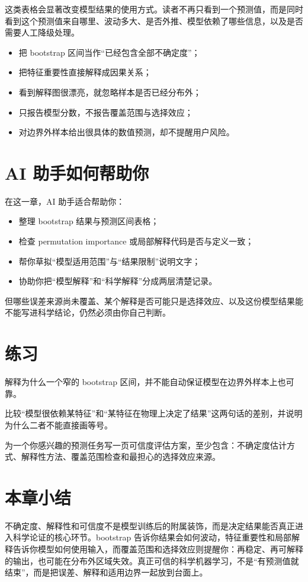这类表格会显著改变模型结果的使用方式。读者不再只看到一个预测值，而是同时看到这个预测值来自哪里、波动多大、是否外推、模型依赖了哪些信息，以及是否需要人工降级处理。

\begin{warnbox}[可信度评估中的常见误区]
\begin{itemize}
    \item 把 bootstrap 区间当作“已经包含全部不确定度”；
    \item 把特征重要性直接解释成因果关系；
    \item 看到解释图很漂亮，就忽略样本是否已经分布外；
    \item 只报告模型分数，不报告覆盖范围与选择效应；
    \item 对边界外样本给出很具体的数值预测，却不提醒用户风险。
\end{itemize}
\end{warnbox}

\section{AI 助手如何帮助你}

在这一章，AI 助手适合帮助你：

\begin{itemize}
    \item 整理 bootstrap 结果与预测区间表格；
    \item 检查 permutation importance 或局部解释代码是否与定义一致；
    \item 帮你草拟“模型适用范围”与“结果限制”说明文字；
    \item 协助你把“模型解释”和“科学解释”分成两层清楚记录。
\end{itemize}

但哪些误差来源尚未覆盖、某个解释是否可能只是选择效应、以及这份模型结果能不能写进科学结论，仍然必须由你自己判断。

\section{练习}

\begin{exercisebox}[基础练习]
解释为什么一个窄的 bootstrap 区间，并不能自动保证模型在边界外样本上也可靠。
\end{exercisebox}

\begin{exercisebox}[进阶练习]
比较“模型很依赖某特征”和“某特征在物理上决定了结果”这两句话的差别，并说明为什么二者不能直接画等号。
\end{exercisebox}

\begin{exercisebox}[开放练习]
为一个你感兴趣的预测任务写一页可信度评估方案，至少包含：不确定度估计方式、解释性方法、覆盖范围检查和最担心的选择效应来源。
\end{exercisebox}

\section{本章小结}

不确定度、解释性和可信度不是模型训练后的附属装饰，而是决定结果能否真正进入科学论证的核心环节。bootstrap 告诉你结果会如何波动，特征重要性和局部解释告诉你模型如何使用输入，而覆盖范围和选择效应则提醒你：再稳定、再可解释的输出，也可能在分布外区域失效。真正可信的科学机器学习，不是“有预测值就结束”，而是把误差、解释和适用边界一起放到台面上。
